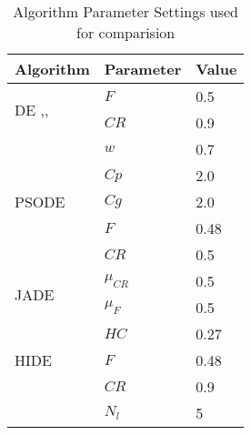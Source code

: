 

\begin{table}[b]
\centering
\caption{Algorithm Parameter Settings used for comparision}
\label{table:params}
\begin{tabular}{|l|l|l|}
\hline
Algorithm & Parameter & Value \\
\hline
\multirow{2}{*}{DE \cite{storn1995differential},\cite{Mezura-Montes},\cite{brest2006self}} & $F$ & 0.5 \\ \cline{2-3} 
                  & $CR$ & 0.9 \\ \hline
\multirow{5}{*}{PSODE \cite{}} & $w$ & 0.7 \\ \cline{2-3} 
                  & $Cp$ & 2.0 \\ \cline{2-3} 
                  & $Cg$ & 2.0 \\ \cline{2-3} 
                  & $F$ & 0.48 \\ \cline{2-3} 
                  & $CR$ & 0.5 \\ \hline
\multirow{2}{*}{JADE \cite{zhang2009jade}} & $\mu_{CR}$ & 0.5 \\ \cline{2-3} 
                  & $\mu_{F}$ & 0.5 \\ \hline
\multirow{3}{*}{HIDE} & $HC$ & 0.27 \\ \cline{2-3}
				& $F$ & 0.48 \\ \cline{2-3}
				& $CR$ & 0.9 \\ \cline{2-3}
                  & $N_{l}$ & 5 \\ \hline
\end{tabular}
\end{table}